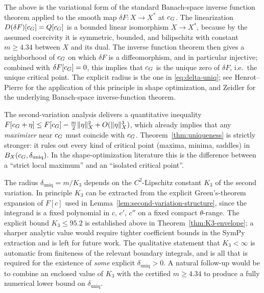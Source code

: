 \begin{remark}
The above is the variational form of the standard Banach-space inverse
function theorem applied to the smooth map $\delta F\colon X \to X^{*}$
at $c_{G}$.  The linearization $D(\delta F)[c_{G}] = Q[c_{G}]$ is a bounded
linear isomorphism $X \to X^{*}$, because by the assumed coercivity it
is symmetric, bounded, and bilipschitz with constant $m \geq 4.34$
between $X$ and its dual.  The inverse function theorem then gives a
neighborhood of $c_{G}$ on which $\delta F$ is a diffeomorphism, and in
particular injective; combined with $\delta F[c_{G}] = 0$, this implies
that $c_{G}$ is the unique zero of $\delta F$, i.e.\ the unique critical
point.  The explicit radius is the one in
\eqref{eq:delta-uniq}; see Henrot--Pierre
\cite[Ch.~5]{HenrotPierre} for the application of this principle in
shape optimization, and Zeidler \cite[Thm.~4.B]{ZeidlerI} for the
underlying Banach-space inverse-function theorem.
\end{remark}

\begin{remark}
The second-variation analysis delivers a quantitative inequality
$F[c_{G}+\eta] \leq F[c_{G}] - \tfrac{m}{2}\|\eta\|_{X}^{2} +
O(\|\eta\|_{X}^{3})$, which already implies that any \emph{maximizer}
near $c_{G}$ must coincide with $c_{G}$.  Theorem~\ref{thm:uniqueness}
is strictly stronger: it rules out every kind of critical point
(maxima, minima, saddles) in $B_{X}(c_{G}, \delta_{\mathrm{uniq}})$.
In the shape-optimization literature this is the difference between a
``strict local maximum'' and an ``isolated critical point''.
\end{remark}

\begin{remark}
The radius $\delta_{\mathrm{uniq}} = m/K_{3}$ depends on the
$C^{2}$-Lipschitz constant $K_{3}$ of the second variation.  In
principle $K_{3}$ can be extracted from the explicit Green's-theorem
expansion of $F[c]$ used in
Lemma~\ref{lem:second-variation-structure}, since the integrand is a
fixed polynomial in $c$, $c'$, $c''$ on a fixed compact $\theta$-range.
The explicit bound $K_{3}\leq 95.2$ is established above in
Theorem~\ref{thm:K3-envelope}; a sharper analytic value would
require tighter coefficient bounds in the SymPy extraction and is
left for future work. The
qualitative statement that $K_{3} < \infty$ is automatic from
finiteness of the relevant boundary integrals, and is all that is
required for the existence of \emph{some} explicit $\delta_{\mathrm{uniq}} > 0$.
A natural follow-up would be to combine an enclosed value of $K_{3}$
with the certified $m \geq 4.34$ to produce a fully numerical lower
bound on $\delta_{\mathrm{uniq}}$.
\end{remark}

